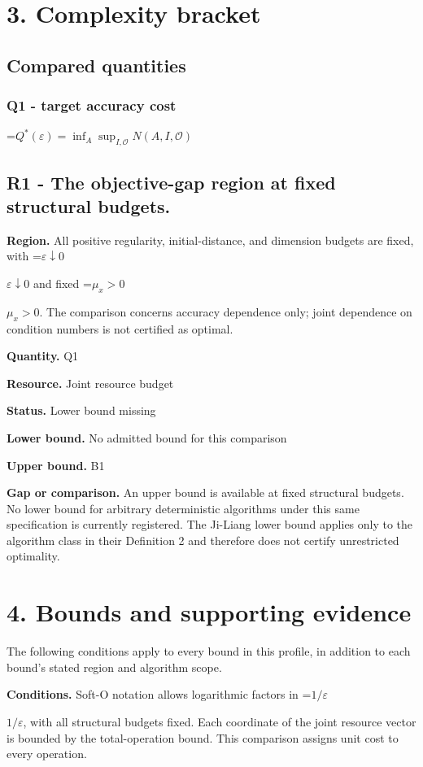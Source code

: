 \documentclass[10pt,a4paper]{article}
\newcommand{\AtlasMath}[1]{\par\begingroup\centering\setbox0=\hbox{$\displaystyle #1$}\ifdim\wd0>1.4\linewidth\typeout{ATLAS WIDE FORMULA: \the\wd0}\fi\ifdim\wd0>\linewidth\resizebox{\linewidth}{!}{\box0}\else\box0\fi\par\endgroup}
\newcommand{\AtlasInlineMath}[1]{\begingroup\setbox0=\hbox{$#1$}\ifdim\wd0>.4\linewidth\endgroup\AtlasMath{#1}\else\endgroup$#1$\fi}
\begin{document}
\section{3. Complexity bracket}
\subsection{Compared quantities}
\subsubsection{Q1 - target accuracy cost}
\AtlasMath{Q^*(\varepsilon)=\inf_A\sup_{I,\mathcal O}N(A,I,\mathcal O)}
\subsection{R1 - The objective-gap region at fixed structural budgets.}
\textbf{Region.} All positive regularity, initial-distance, and dimension budgets are fixed, with \AtlasInlineMath{\varepsilon\downarrow0} and fixed \AtlasInlineMath{\mu_x>0}. The comparison concerns accuracy dependence only; joint dependence on condition numbers is not certified as optimal.

\textbf{Quantity.} Q1

\textbf{Resource.} Joint resource budget

\textbf{Status.} Lower bound missing

\textbf{Lower bound.} No admitted bound for this comparison

\textbf{Upper bound.} B1

\textbf{Gap or comparison.} An upper bound is available at fixed structural budgets. No lower bound for arbitrary deterministic algorithms under this same specification is currently registered. The Ji-Liang lower bound applies only to the algorithm class in their Definition 2 and therefore does not certify unrestricted optimality.

\section{4. Bounds and supporting evidence}
The following conditions apply to every bound in this profile, in addition to each bound's stated region and algorithm scope.

\textbf{Conditions.} Soft-O notation allows logarithmic factors in \AtlasInlineMath{1/\varepsilon}, with all structural budgets fixed. Each coordinate of the joint resource vector is bounded by the total-operation bound. This comparison assigns unit cost to every operation.
\end{document}
